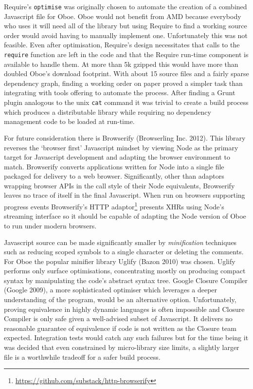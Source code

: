 \documentclass[12pt, ]{article}
\begin{document}
Require's \texttt{optimise} was originally chosen to automate the
creation of a combined Javascript file for Oboe. Oboe would not benefit
from AMD because everybody who uses it will need all of the library but
using Require to find a working source order would avoid having to
manually implement one. Unfortunately this was not feasible. Even after
optimisation, Require's design necessitates that calls to the
\texttt{require} function are left in the code and that the Require
run-time component is available to handle them. At more than 5k gzipped
this would have more than doubled Oboe's download footprint. With about
15 source files and a fairly sparse dependency graph, finding a working
order on paper proved a simpler task than integrating with tools
offering to automate the process. After finding a Grunt plugin analogous
to the unix \texttt{cat} command it was trivial to create a build
process which produces a distributable library while requiring no
dependency management code to be loaded at run-time.

For future consideration there is Browserify (Browserling Inc. 2012).
This library reverses the `browser first' Javascript mindset by viewing
Node as the primary target for Javascript development and adapting the
browser environment to match. Browserify converts applications written
for Node into a single file packaged for delivery to a web browser.
Significantly, other than adaptors wrapping browser APIs in the call
style of their Node equivalents, Browserify leaves no trace of itself in
the final Javascript. When run on browsers supporting progress events
Browserify's HTTP adaptor\footnote{\url{https://github.com/substack/http-browserify}}
presents XHRs using Node's streaming interface so it should be capable
of adapting the Node version of Oboe to run under modern browsers.

Javascript source can be made significantly smaller by
\emph{minification} techniques such as reducing scoped symbols to a
single character or deleting the comments. For Oboe the popular minifier
library Uglify (Bazon 2010) was chosen. Uglify performs only surface
optimisations, concentrating mostly on producing compact syntax by
manipulating the code's abstract syntax tree. Google Closure Compiler
(Google 2009), a more sophisticated optimiser which leverages a deeper
understanding of the program, would be an alternative option.
Unfortunately, proving equivalence in highly dynamic languages is often
impossible and Closure Compiler is only safe given a well-advised subset
of Javascript. It delivers no reasonable guarantee of equivalence if
code is not written as the Closure team expected. Integration tests
would catch any such failures but for the time being it was decided that
even constrained by micro-library size limits, a slightly larger file is
a worthwhile tradeoff for a safer build process.
\end{document}
